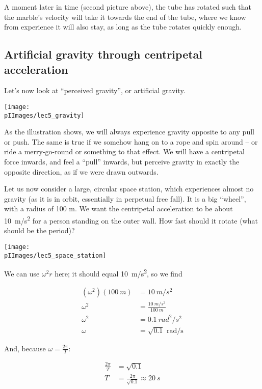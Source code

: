 A moment later in time (second picture above), the tube has rotated such that the marble's velocity will take it towards the end of the tube, where we know from experience it will also stay, as long as the tube rotates quickly enough.

\subsection{Artificial gravity through centripetal acceleration}

Let's now look at ``perceived gravity'', or artificial gravity.

\begin{center}
\texttt{[image: \\pIImages/lec5\_gravity]}
\end{center}

As the illustration shows, we will always experience gravity opposite to any pull or push. The same is true if we somehow hang on to a rope and spin around -- or ride a merry-go-round or something to that effect. We will have a centripetal force inwards, and feel a ``pull'' inwards, but perceive gravity in exactly the opposite direction, as if we were drawn outwards.

Let us now consider a large, circular space station, which experiences almost no gravity (as it is in orbit, essentially in perpetual free fall). It is a big ``wheel'', with a radius of 100 m. We want the centripetal acceleration to be about \SI{10}{m/s^2} for a person standing on the outer wall. How fast should it rotate (what should be the period)?

\begin{center}
\texttt{[image: \\pIImages/lec5\_space\_station]}
\end{center}

We can use $\omega^2 r$ here; it should equal \SI{10}{m/s^2}, so we find

\begin{align}
(\omega^2)(\SI{100}{m}) &= \SI{10}{m/s^2}\\
\omega^2 &= \frac{\SI{10}{m/s^2}}{\SI{100}{m}}\\
\omega^2 &= \SI{0.1}{rad^2/s^2}\\
\omega &= \sqrt{0.1} \text{ rad/s}
\end{align}

And, because $\omega = \frac{2 \pi}{T}$:

\begin{align}
\frac{2 \pi}{T} &= \sqrt{0.1}\\
T &= \frac{2 \pi}{\sqrt{0.1}} \approx \SI{20}{s}
\end{align}

